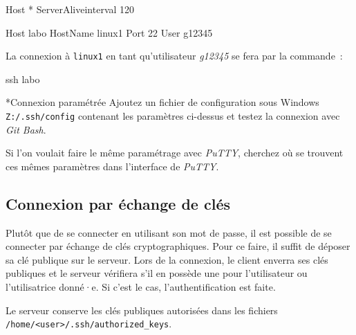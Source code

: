 \documentclass[a4paper,11pt]{article}
\begin{document}
\begin{Console}
	Host * 
		ServerAliveinterval 120

	Host labo
		HostName linux1
		Port 22
		User g12345
\end{Console}

La connexion à \texttt{linux1} en tant qu'utilisateur \textit{g12345} se fera
par la commande~: 

\begin{term}
	ssh labo
\end{term}

\vspace{5mm}
\begin{Exercice}*{Connexion paramétrée}
	Ajoutez un fichier de configuration sous Windows \texttt{Z:/.ssh/config}
	contenant les paramètres ci-dessus et testez la connexion avec \textit{Git
	Bash}.

	Si l'on voulait faire le même paramétrage avec \textit{PuTTY}, cherchez où
	se trouvent ces mêmes paramètres dans l'interface de \textit{PuTTY}.

\end{Exercice}




\subsection{Connexion par échange de clés}

Plutôt que de se connecter en utilisant son mot de passe, il est possible de se
connecter par échange de clés cryptographiques. Pour ce faire, il suffit de
déposer sa clé publique sur le serveur. Lors de la connexion, le client enverra
ses clés publiques et le serveur vérifiera s'il en possède une pour
l'utilisateur ou l'utilisatrice donné·e. Si c'est le cas, l'authentification est
faite. 

Le serveur conserve les clés publiques autorisées dans les fichiers 
\\\texttt{/home/<user>/.ssh/authorized\_keys}.
\end{document}
